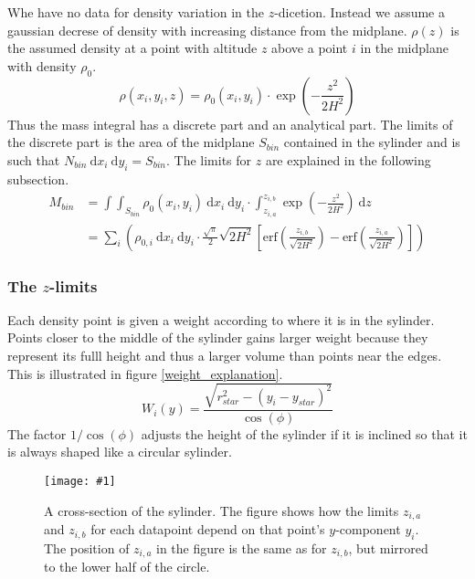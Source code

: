 \documentclass[a4paper, 12pt, english, titlepage]{article}
\newcommand{\erf}[1]{\textrm{erf}\left(#1\right)} %
\newcommand{\D}[1]{\ \mathrm{d}#1} %
\newcommand{\bilde}[3]{
    \begin{figure}[htbp]
        \centering
        \texttt{[image: \#1]}
        \caption{#3 \label{#2}}
    \end{figure}
}
\begin{document}
        Whe have no data for density variation in the $z$-dicetion. Instead we assume a gaussian decrese of density with increasing distance from the midplane. $\rho(z)$ is the assumed density at a point with altitude $z$ above a point $i$ in the midplane with density $\rho_0$.
        $$
        \rho(x_i, y_i, z) = \rho_0(x_i, y_i) \cdot \exp\left(- \frac{z^2}{2H^2}\right)
        $$
        Thus the mass integral has a discrete part and an analytical part. The limits of the discrete part is the area of the midplane $S_{bin}$ contained in the sylinder and is such that $N_{bin} \D{x_i}\D{y_i} = S_{bin}$. The limits for $z$ are explained in the following subsection.
        \begin{align*}
            M_{bin}
                &= \int\int_{S_{bin}} \rho_0(x_i,y_i) \D{x_i}\D{y_i} \cdot
                    \int_{z_{i,a}}^{z_{i,b}} \exp\left(- \frac{z^2}{2H^2}\right) \D{z} \\
                &= \sum_i \left(
                        \rho_{0,i} \D{x_i}\D{y_i} \cdot
                        \frac{\sqrt{\pi}}{2} \sqrt{2H^2}
                        \left[
                            \erf{\frac{z_{i,b}}{\sqrt{2H^2}}} -
                            \erf{\frac{z_{i,a}}{\sqrt{2H^2}}}
                        \right]
                    \right)
        \end{align*}

    \subsubsection{The $z$-limits}
        Each density point is given a weight according to where it is in the sylinder. Points closer to the middle of the sylinder gains larger weight because they represent its fulll height and thus a larger volume than points near the edges. This is illustrated in figure \vref{weight_explanation}.
        $$
        W_i(y) = \frac{\sqrt{r_{star}^2 - (y_i - y_{star})^2}}{\cos(\phi)}
        $$
        The factor $1/\cos(\phi)$ adjusts the height of the sylinder if it is inclined so that it is always shaped like a circular sylinder.
        \bilde{figures/weight_explanation}{weight_explanation}
        {A cross-section of the sylinder. The figure shows how the limits $z_{i,a}$ and $z_{i,b}$ for each datapoint depend on that point's $y$-component $y_i$. The position of $z_{i,a}$ in the figure is the same as for $z_{i,b}$, but mirrored to the lower half of the circle.}
\end{document}

